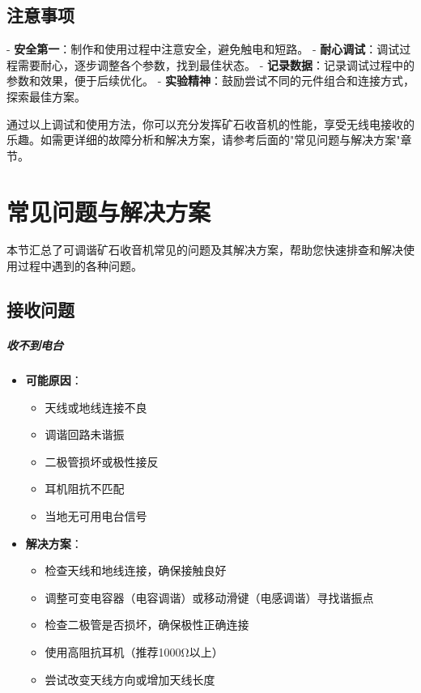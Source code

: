 \documentclass[12pt,UTF8]{ctexbook}
\begin{document}
\subsection{注意事项}

- \textbf{安全第一}：制作和使用过程中注意安全，避免触电和短路。
- \textbf{耐心调试}：调试过程需要耐心，逐步调整各个参数，找到最佳状态。
- \textbf{记录数据}：记录调试过程中的参数和效果，便于后续优化。
- \textbf{实验精神}：鼓励尝试不同的元件组合和连接方式，探索最佳方案。

通过以上调试和使用方法，你可以充分发挥矿石收音机的性能，享受无线电接收的乐趣。如需更详细的故障分析和解决方案，请参考后面的"常见问题与解决方案"章节。

\section{常见问题与解决方案}

本节汇总了可调谐矿石收音机常见的问题及其解决方案，帮助您快速排查和解决使用过程中遇到的各种问题。

\subsection{接收问题}

\subparagraph{收不到电台}

\begin{itemize}[leftmargin=3.5em]
    \item \textbf{可能原因}：
    \begin{itemize}
        \item 天线或地线连接不良
        \item 调谐回路未谐振
        \item 二极管损坏或极性接反
        \item 耳机阻抗不匹配
        \item 当地无可用电台信号
    \end{itemize}
    \item \textbf{解决方案}：
    \begin{itemize}
        \item 检查天线和地线连接，确保接触良好
        \item 调整可变电容器（电容调谐）或移动滑键（电感调谐）寻找谐振点
        \item 检查二极管是否损坏，确保极性正确连接
        \item 使用高阻抗耳机（推荐1000Ω以上）
        \item 尝试改变天线方向或增加天线长度
    \end{itemize}
\end{itemize}
\end{document}
